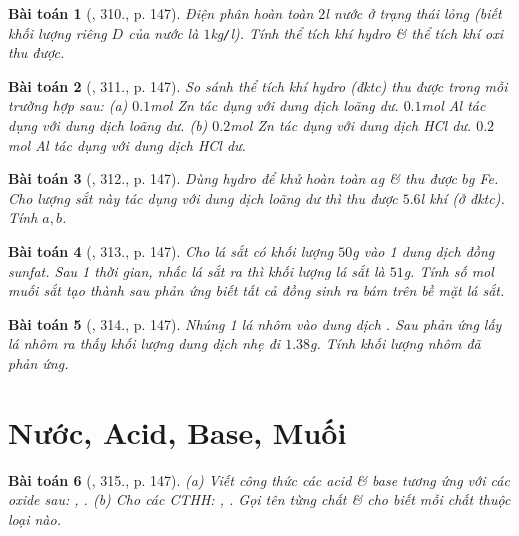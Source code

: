 \documentclass{article}
\newtheorem{baitoan}{Bài toán}
\begin{document}
\begin{baitoan}[\cite{An_400_BT_Hoa_Hoc_8_2020}, 310., p. 147]
	Điện phân hoàn toàn $2$\emph{l} nước ở trạng thái lỏng (biết khối lượng riêng $D$ của nước là $1$\emph{kg\texttt{/}l}). Tính thể tích khí hydro \& thể tích khí oxi thu được.
\end{baitoan}

\begin{baitoan}[\cite{An_400_BT_Hoa_Hoc_8_2020}, 311., p. 147]
	So sánh thể tích khí hydro (đktc) thu được trong mỗi trường hợp sau: (a) $0.1$\emph{mol Zn} tác dụng với dung dịch \emph{} loãng dư. $0.1$\emph{mol Al} tác dụng với dung dịch \emph{} loãng dư. (b) $0.2$\emph{mol Zn} tác dụng với dung dịch \emph{HCl} dư. $0.2$\emph{mol Al} tác dụng với dung dịch \emph{HCl} dư.
\end{baitoan}

\begin{baitoan}[\cite{An_400_BT_Hoa_Hoc_8_2020}, 312., p. 147]
	Dùng hydro để khử hoàn toàn $a$\emph{g} \emph{} \& thu được $b$\emph{g Fe}. Cho lượng sắt này tác dụng với dung dịch \emph{} loãng dư thì thu được $5.6$\emph{l} khí \emph{} (ở đktc). Tính $a,b$.
\end{baitoan}

\begin{baitoan}[\cite{An_400_BT_Hoa_Hoc_8_2020}, 313., p. 147]
	Cho lá sắt có khối lượng $50$\emph{g} vào 1 dung dịch đồng sunfat. Sau 1 thời gian, nhấc lá sắt ra thì khối lượng lá sắt là $51$\emph{g}. Tính số \emph{mol} muối sắt tạo thành sau phản ứng biết tất cả đồng sinh ra bám trên bề mặt lá sắt.
\end{baitoan}

\begin{baitoan}[\cite{An_400_BT_Hoa_Hoc_8_2020}, 314., p. 147]
	Nhúng 1 lá nhôm vào dung dịch \emph{}. Sau phản ứng lấy lá nhôm ra thấy khối lượng dung dịch nhẹ đi $1.38$\emph{g}. Tính khối lượng nhôm đã phản ứng.
\end{baitoan}


\section{Nước, Acid, Base, Muối}

\begin{baitoan}[\cite{An_400_BT_Hoa_Hoc_8_2020}, 315., p. 147]
	(a) Viết công thức các acid \& base tương ứng với các oxide sau: \emph{, }. (b) Cho các CTHH: \emph{, }. Gọi tên từng chất \& cho biết mỗi chất thuộc loại nào.
\end{baitoan}
\end{document}
